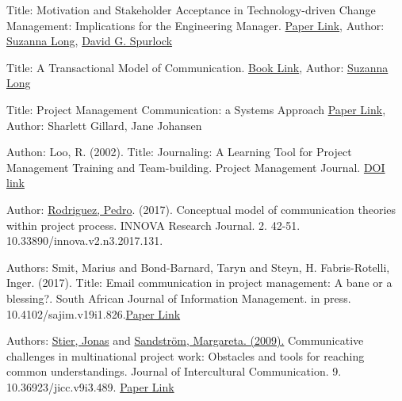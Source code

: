 \documentclass[runningheads]{llncs}
\begin{document}
\begin{thebibliography}{8}
Title: Motivation and Stakeholder Acceptance in Technology-driven Change Management: Implications for the Engineering Manager. \href{https://www.tandfonline.com/doi/abs/10.1080/10429247.2008.11431764}{Paper Link}, Author: \href{https://scholar.google.com/citations?user=7_LPDDQAAAAJ&hl=en}{Suzanna Long}, \href{https://emse.mst.edu/facultystafffacilities/emsefaculty/davidspurlock/}{David G. Spurlock}

Title: A Transactional Model of Communication. \href{https://www.taylorfrancis.com/chapters/edit/10.4324/9781315080918-5/transactional-model-communication-dean-barnlund}{Book Link}, Author: \href{https://scholar.google.com/citations?user=7_LPDDQAAAAJ&hl=en}{Suzanna Long}

Title: Project Management Communication: a Systems Approach \href{https://www.researchgate.net/publication/220195825_Project_Management_Communication_a_Systems_Approach}{Paper Link}, Author: Sharlett Gillard, Jane Johansen

Authon: Loo, R. (2002). Title: Journaling: A Learning Tool for Project Management Training and Team-building. Project Management Journal. \href{https://doi.org/10.1177/875697280203300407}{DOI link}

Author: \href{https://scholar.google.com/citations?user=o355sjwAAAAJ&hl=en}{Rodriguez, Pedro}. (2017). Conceptual model of communication theories within project process. INNOVA Research Journal. 2. 42-51. 10.33890/innova.v2.n3.2017.131. 

Authors: Smit, Marius and Bond-Barnard, Taryn and Steyn, H. Fabris-Rotelli, Inger. (2017). Title: Email communication in project management: A bane or a blessing?. South African Journal of Information Management. in press. 10.4102/sajim.v19i1.826.\href{https://www.researchgate.net/publication/313770452_Email_communication_in_project_management_A_bane_or_a_blessing} {Paper Link}

Authors: \href{https://www.researchgate.net/profile/Jonas-Stier}{Stier, Jonas} and \href{https://www.researchgate.net/profile/Margareta-Sandstroem}{Sandström, Margareta. (2009).} Communicative challenges in multinational project work: Obstacles and tools for reaching common understandings. Journal of Intercultural Communication. 9. 10.36923/jicc.v9i3.489. \href{https://www.researchgate.net/publication/285593311_Communicative_challenges_in_multinational_project_work_Obstacles_and_tools_for_reaching_common_understandings}{Paper Link}


\end{thebibliography}
\end{document}
